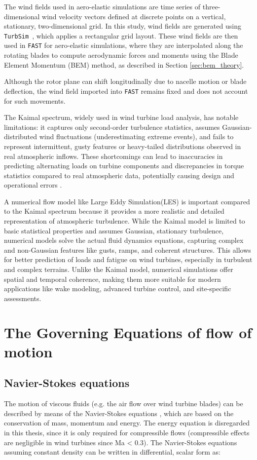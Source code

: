 The wind fields used in aero-elastic simulations are time series of three-dimensional wind velocity vectors defined at discrete points on a vertical, stationary, two-dimensional grid. In this study, wind fields are generated using \texttt{TurbSim}~\cite{ref57}, which applies a rectangular grid layout. These wind fields are then used in \texttt{FAST} for aero-elastic simulations, where they are interpolated along the rotating blades to compute aerodynamic forces and moments using the Blade Element Momentum (BEM) method, as described in Section \ref{sec:bem_theory}. 

Although the rotor plane can shift longitudinally due to nacelle motion or blade deflection, the wind field imported into \texttt{FAST} remains fixed and does not account for such movements.


The Kaimal spectrum, widely used in wind turbine load analysis, has notable limitations: it captures only second-order turbulence statistics, assumes Gaussian-distributed wind fluctuations (underestimating extreme events), and fails to represent intermittent, gusty features or heavy-tailed distributions observed in real atmospheric inflows. These shortcomings can lead to inaccuracies in predicting alternating loads on turbine components and discrepancies in torque statistics compared to real atmospheric data, potentially causing design and operational errors \cite{Mucke2011}.

A numerical flow model like Large Eddy Simulation(LES) is important compared to the Kaimal spectrum because it provides a more realistic and detailed representation of atmospheric turbulence. While the Kaimal model is limited to basic statistical properties and assumes Gaussian, stationary turbulence, numerical models solve the actual fluid dynamics equations, capturing complex and non-Gaussian features like gusts, ramps, and coherent structures. This allows for better prediction of loads and fatigue on wind turbines, especially in turbulent and complex terrains. Unlike the Kaimal model, numerical simulations offer spatial and temporal coherence, making them more suitable for modern applications like wake modeling, advanced turbine control, and site-specific assessments. \cite{Doubrawa2019}


\section{The Governing Equations of flow of motion}
\subsection{Navier-Stokes equations}
The motion of viscous fluids (e.g. the air flow over wind turbine blades) can be described by
means of the Navier-Stokes equations \cite{NSeqn}, which are based on the conservation of mass, momentum
and energy. The energy equation is disregarded in this thesis, since it is only required for
compressible flows (compressible effects are negligible in wind turbines since Ma < 0.3). The
Navier-Stokes equations assuming constant density can be written in differential, scalar form
as:

